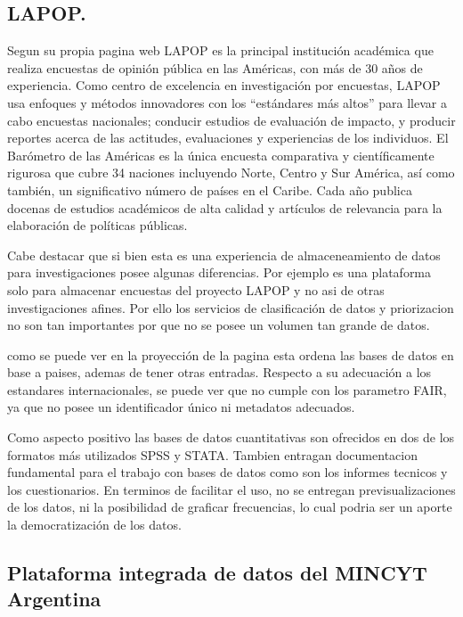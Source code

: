 \documentclass[
  14pt,
]{book}
\begin{document}
\hypertarget{lapop.}{%
\subsection{LAPOP.}\label{lapop.}}

Segun su propia pagina web \citep{lapop_Inicio_2020} LAPOP es la principal institución académica que realiza encuestas de opinión pública en las Américas, con más de 30 años de experiencia. Como centro de excelencia en investigación por encuestas, LAPOP usa enfoques y métodos innovadores con los ``estándares más altos'' para llevar a cabo encuestas nacionales; conducir estudios de evaluación de impacto, y producir reportes acerca de las actitudes, evaluaciones y experiencias de los individuos. El Barómetro de las Américas es la única encuesta comparativa y científicamente rigurosa que cubre 34 naciones incluyendo Norte, Centro y Sur América, así como también, un significativo número de países en el Caribe. Cada año publica docenas de estudios académicos de alta calidad y artículos de relevancia para la elaboración de políticas públicas.

Cabe destacar que si bien esta es una experiencia de almaceneamiento de datos para investigaciones posee algunas diferencias. Por ejemplo es una plataforma solo para almacenar encuestas del proyecto LAPOP y no asi de otras investigaciones afines. Por ello los servicios de clasificación de datos y priorizacion no son tan importantes por que no se posee un volumen tan grande de datos.

como se puede ver en la proyección de la pagina esta ordena las bases de datos en base a paises, ademas de tener otras entradas. Respecto a su adecuación a los estandares internacionales, se puede ver que no cumple con los parametro FAIR, ya que no posee un identificador único ni metadatos adecuados.

Como aspecto positivo las bases de datos cuantitativas son ofrecidos en dos de los formatos más utilizados SPSS y STATA. Tambien entragan documentacion fundamental para el trabajo con bases de datos como son los informes tecnicos y los cuestionarios. En terminos de facilitar el uso, no se entregan previsualizaciones de los datos, ni la posibilidad de graficar frecuencias, lo cual podria ser un aporte la democratización de los datos.

\hypertarget{plataforma-integrada-de-datos-del-mincyt-argentina}{%
\subsection{Plataforma integrada de datos del MINCYT Argentina}\label{plataforma-integrada-de-datos-del-mincyt-argentina}}
\end{document}
